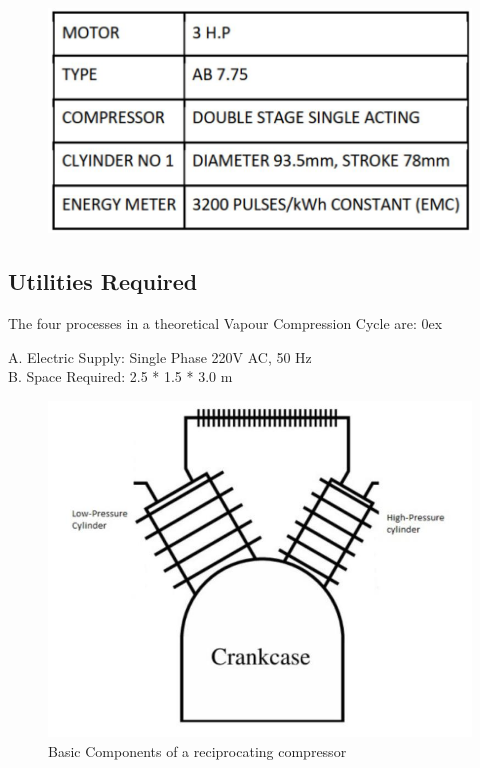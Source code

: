 \documentclass[11pt]{article}
\begin{document}
\begin{figure}[H]
	\centering
	\includegraphics[scale=0.3]{specs.jpg}
\end{figure}


\subsection{Utilities Required}

The four processes in a theoretical Vapour Compression Cycle are:
\parindent 0ex

A. Electric Supply: Single Phase 220V AC, 50 Hz\\
B. Space Required: 2.5 * 1.5 * 3.0 m 

\begin{figure}[H]
	\centering
	\includegraphics[scale=0.3]{compressor.jpg}
	\caption{Basic Components of a reciprocating compressor}
\end{figure}
\end{document}

